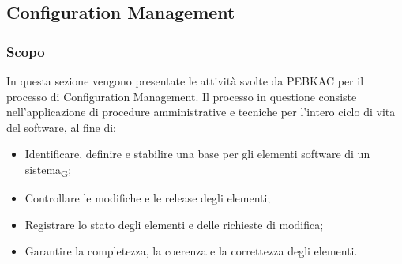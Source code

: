 \subsection{Configuration Management}
\subsubsection{Scopo}
In questa sezione vengono presentate le attività svolte da PEBKAC per il processo di Configuration Management. Il processo in questione consiste nell'applicazione di procedure amministrative e tecniche per l'intero ciclo di vita del software, al fine di:
\begin{itemize}
    \item Identificare, definire e stabilire una base per gli elementi software di un sistema\textsubscript{G};
    \item Controllare le modifiche e le release degli elementi;
    \item Registrare lo stato degli elementi e delle richieste di modifica;
    \item Garantire la completezza, la coerenza e la correttezza degli elementi.
\end{itemize}

